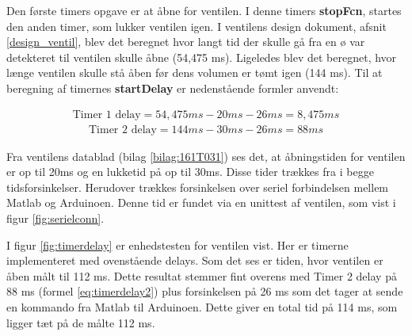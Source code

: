 Den første timers opgave er at åbne for ventilen. I denne timers \textbf{stopFcn}, startes den anden timer, som lukker ventilen igen. I ventilens design dokument, afsnit \ref{design_ventil}, blev det beregnet hvor langt tid der skulle gå fra en ø var detekteret til ventilen skulle åbne (54,475 ms). Ligeledes blev det beregnet, hvor længe ventilen skulle stå åben før dens volumen er tømt igen (144 ms). Til at beregning af timernes \textbf{startDelay} er nedenstående formler anvendt: 

\begin{align}
\text{Timer 1 delay}=54,475ms-20ms-26ms=8,475ms
\label{eq:timerdelay1}
\end{align} 
\begin{align}
\text{Timer 2 delay}=144ms-30ms-26ms= 88ms
\label{eq:timerdelay2}
\end{align} 

Fra ventilens datablad (bilag \ref{bilag:161T031}) ses det, at åbningstiden for ventilen er op til 20ms og en lukketid på op til 30ms. Disse tider trækkes fra i begge tidsforsinkelser. Herudover trækkes forsinkelsen over seriel forbindelsen mellem Matlab og Arduinoen. Denne tid er fundet via en unittest af ventilen, som vist i figur \ref{fig:serielconn}.   

I figur \ref{fig:timerdelay} er enhedstesten for ventilen vist. Her er timerne implementeret med ovenstående delays. Som det ses er tiden, hvor ventilen er åben målt til 112 ms. Dette resultat stemmer fint overens med Timer 2 delay på 88 ms (formel \ref{eq:timerdelay2}) plus forsinkelsen på 26 ms som det tager at sende en kommando fra Matlab til Arduinoen. Dette giver en total tid på 114 ms, som ligger tæt på de målte 112 ms. 

